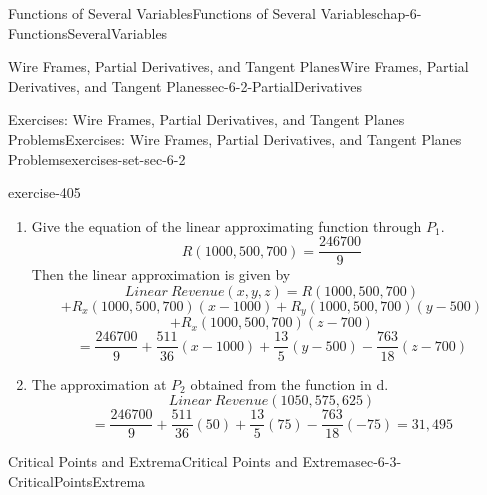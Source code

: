 \documentclass[oneside,10pt,]{book}
\numberwithin{equation}{section}
\begin{document}
\begin{chapterptx}{Functions of Several Variables}{}{Functions of Several Variables}{}{}{chap-6-FunctionsSeveralVariables}
\begin{sectionptx}{Wire Frames, Partial Derivatives, and Tangent Planes}{}{Wire Frames, Partial Derivatives, and Tangent Planes}{}{}{sec-6-2-PartialDerivatives}
\begin{exercises-subsection-numberless}{Exercises: Wire Frames, Partial Derivatives, and Tangent Planes Problems}{}{Exercises: Wire Frames, Partial Derivatives, and Tangent Planes Problems}{}{}{exercises-set-sec-6-2}
\begin{exercisegroup}
\begin{divisionexerciseeg}{11}{}{}{exercise-405}
\begin{enumerate}[label=(\alph*)]
\begin{equation*}
R_y  (1000,500,700)=  -\frac{11000 }{3000}-\frac{500}{25}-\frac{1400}{375}+30=\frac{13}{5}
\end{equation*}
%
\begin{equation*}
R_z  (1000,500,700)=  -\frac{89000 }{3600}-\frac{1000 }{375}-\frac{700}{20}+20=-\frac{76}{18}
\end{equation*}
\item\hypertarget{li-650}{}\hypertarget{p-2321}{}%
Give the equation of the linear approximating function through \(P_1\).%
%
\begin{equation*}
R(1000,500,700)=\frac{246700}{9}
\end{equation*}
\hypertarget{p-2322}{}%
Then the linear approximation is given by%
%
\begin{equation*}
Linear\ Revenue(x,y,z)= R(1000,500,700)
\end{equation*}
%
\begin{equation*}
+R_x  (1000,500,700)  (x-1000)
+  R_y  (1000,500,700)(y-500)
\end{equation*}
%
\begin{equation*}
+  R_x  (1000,500,700)(z-700) 
\end{equation*}
%
\begin{equation*}
=  \frac{246700}{9}+\frac{511}{36} (x-1000)+\frac{13}{5} (y-500)-\frac{763}{18}(z-700)
\end{equation*}
\item\hypertarget{li-651}{}\hypertarget{p-2323}{}%
The approximation at \(P_2\) obtained from the function in d.%
%
\begin{equation*}
Linear\ Revenue(1050,575,625)
\end{equation*}
%
\begin{equation*}
=  \frac{246700}{9}+\frac{511}{36} (50)+\frac{13}{5} (75)-\frac{763}{18} (-75)
=31,495  
\end{equation*}
\end{enumerate}
\end{divisionexerciseeg}%
\end{exercisegroup}
\par\medskip\noindent
\end{exercises-subsection-numberless}
\end{sectionptx}
%
%
\typeout{************************************************}
\typeout{************************************************}
%
\begin{sectionptx}{Critical Points and Extrema}{}{Critical Points and Extrema}{}{}{sec-6-3-CriticalPointsExtrema}

\end{sectionptx}
\end{chapterptx}
\end{document}
